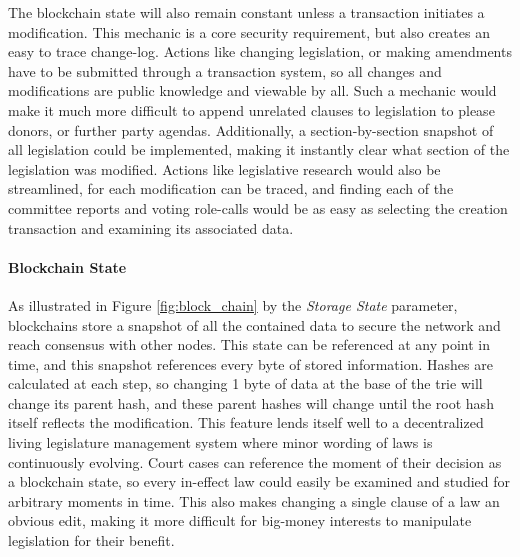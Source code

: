 \documentclass[letterpaper,twocolumn]{article}
\begin{document}
The blockchain state will also remain constant unless a transaction initiates a modification.  This mechanic is a core security requirement, but also creates an easy to trace change-log.  Actions like changing legislation, or making amendments have to be submitted through a transaction system, so all changes and modifications are public knowledge and viewable by all.  Such a mechanic would make it much more difficult to append unrelated clauses to legislation to please donors, or further party agendas.  Additionally, a section-by-section snapshot of all legislation could be implemented, making it instantly clear what section of the legislation was modified.  Actions like legislative research would also be streamlined, for each modification can be traced, and finding each of the committee reports and voting role-calls would be as easy as selecting the creation transaction and examining its associated data. 




\paragraph{Blockchain State}
As illustrated in Figure \ref{fig:block_chain} by the \textit{Storage State} parameter, blockchains store a snapshot of all the contained data to secure the network and reach consensus with other nodes.  This state can be referenced at any point in time, and this snapshot references every byte of stored information.  Hashes are calculated at each step, so changing 1 byte of data at the base of the trie will change its parent hash, and these parent hashes will change until the root hash itself reflects the modification.  This feature lends itself well to a decentralized living legislature management system where minor wording of laws is continuously evolving.  Court cases can reference the moment of their decision as a blockchain state, so every in-effect law could easily be examined and studied for arbitrary moments in time.  This also makes changing a single clause of a law an obvious edit, making it more difficult for big-money interests to manipulate legislation for their benefit.
\end{document}
